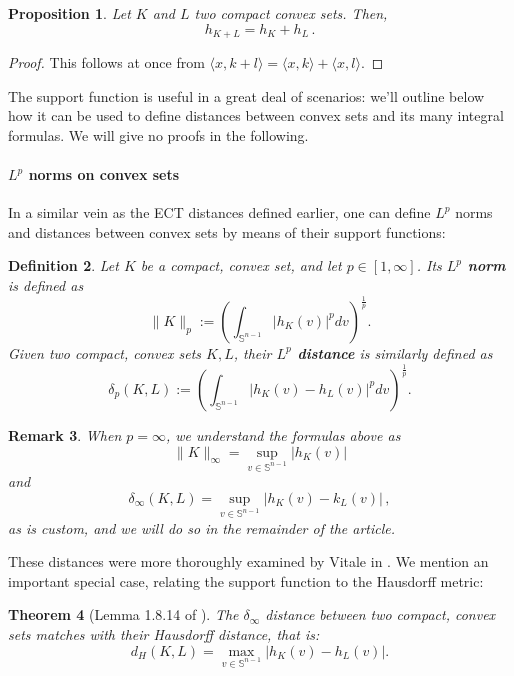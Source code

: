 \documentclass[a4paper]{article}
\newtheorem{theorem}{Theorem}[section]
\newtheorem{prop}[theorem]{Proposition}
\newtheorem{definition}[theorem]{Definition}
\newtheorem{remark}[theorem]{Remark}
\newcommand{\bb}{\mathbb}
\begin{document}
\begin{prop}
	\label{MinkAdd}
	Let $K$ and $L$ two compact convex sets. Then,
	\[ h_{K+L}=h_K+h_L\, . \]
\end{prop}

\begin{proof}
	This follows at once from $\langle x, k+l \rangle=\langle x, k \rangle+\langle x, l \rangle$.
\end{proof}

The support function is useful in a great deal of scenarios: we'll outline below how it can be used to define distances between convex sets and its many integral formulas. We will give no proofs in the following.

\paragraph{$L^p$ norms on convex sets}
\label{LpNorms}

In a similar vein as the ECT distances defined earlier, one can define $L^p$ norms and distances between convex sets by means of their support functions:

\begin{definition}
	\label{LpNorm}
	Let $K$ be a compact, convex set, and let $p\in [1, \infty]$. Its \textbf{$L^p$ norm} is defined as
	\[ \|K\|_p:=\left(\int_{\bb S^{n-1}} |h_K(v)|^p dv\right)^\frac{1}{p}. \]
	Given two compact, convex sets $K,L$, their \textbf{$L^p$ distance} is similarly defined as 
	\[ \delta_p(K,L):=\left(\int_{\bb S^{n-1}} |h_K(v)-h_L(v)|^p dv\right)^\frac{1}{p}. \]
\end{definition}

\begin{remark}
	When $p=\infty$, we understand the formulas above as
	\[ \|K\|_\infty = \sup_{v \in \bb S^{n-1}} |h_K(v)| \]
	and 
	\[ \delta_\infty(K,L) = \sup_{v \in \bb S^{n-1}} |h_K(v)-k_L(v)|\, , \]
	as is custom, and we will do so in the remainder of the article.
\end{remark}
These distances were more thoroughly examined by Vitale in \cite{vitale1985lp}. We mention an important special case, relating the support function to the Hausdorff metric:
\begin{theorem}[Lemma 1.8.14 of \cite{schneider2013convex}]
	\label{HausdorffDist}
	The $\delta_\infty$ distance between two compact, convex sets matches with their Hausdorff distance, that is:
	\[ d_H(K,L)=\max_{v \in \bb S^{n-1}} |h_K(v)-h_L(v)|.\] 
\end{theorem}
\end{document}
